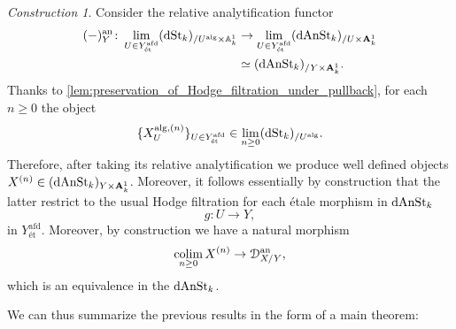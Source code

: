 \documentclass[10pt,a4paper,reqno]{amsart} %
\theoremstyle{plain}
\theoremstyle{definition}
\theoremstyle{remark}
\numberwithin{equation}{section}
\newtheorem{construction}[thm]{Construction}
\begin{document}
\begin{construction}
    Consider the relative analytification functor
        \begin{align*}
            (-)^\mathrm{an}_Y \colon \lim_{U \in Y^{\mathrm{afd}}_{\textrm{\'et}}} (\mathrm{dSt}_k)_{/ U^\mathrm{alg} \times \mathbb A^1_k} & \to \lim_{U \in Y^{\mathrm{afd}}_\textrm{\'et}} (\mathrm{dAnSt}_k)_{/ U \times \mathbf A^1_k}  \\
                                                                                 & \simeq (\mathrm{dAnSt}_k)_{/ Y \times \mathbf A^1_k}.
        \end{align*}
    Thanks to \cref{lem:preservation_of_Hodge_filtration_under_pullback}, for each $n \ge 0$ the object
        \[
            \{ X^{\mathrm{alg}, (n)}_{U} \}_{U \in Y^\mathrm{afd}_\textrm{\'et}}  \in \lim_{n \ge 0} (\mathrm{dSt}_k)_{/ U^\mathrm{alg}}.
        \]
    Therefore, after taking its relative analytification we produce well defined objects $X^{(n)} \in (\mathrm{dAnSt}_k)_{Y \times \mathbf A^1_k}$. Moreover, 
    it follows essentially by construction that the latter restrict to the usual
    Hodge filtration for each \'etale morphism in $\mathrm{dAnSt}_k$
        \[
            g \colon U \to Y,  
        \]
    in $Y^\mathrm{afd}_\textrm{\'et}$. Moreover, by construction we have a natural morphism
        \[
            \operatorname*{colim}_{n \ge 0} X^{(n)} \to \mathcal D_{X/ Y} ^\mathrm{an},  
        \]
    which is an equivalence in the \infcat $\mathrm{dAnSt}_k$.
\end{construction}

We can thus summarize the previous results in the form of a main theorem:
\end{document}
